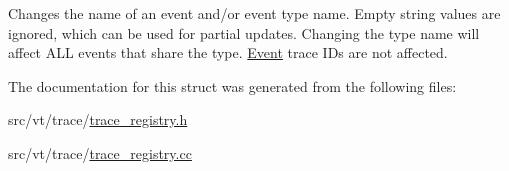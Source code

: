 Changes the name of an event and/or event type name. Empty string values are ignored, which can be used for partial updates. Changing the type name will affect A\+LL events that share the type. \hyperlink{structvt_1_1trace_1_1_event}{Event} trace I\+Ds are not affected. 

The documentation for this struct was generated from the following files\+:\begin{DoxyCompactItemize}
\item 
src/vt/trace/\hyperlink{trace__registry_8h}{trace\+\_\+registry.\+h}\item 
src/vt/trace/\hyperlink{trace__registry_8cc}{trace\+\_\+registry.\+cc}\end{DoxyCompactItemize}
